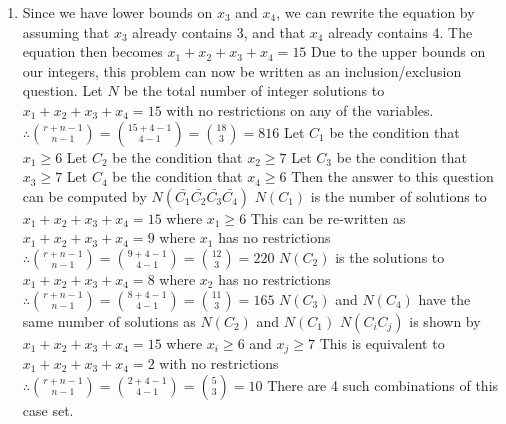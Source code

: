 \documentclass{article}
\begin{document}
\begin{enumerate}
		\item Since we have lower bounds on $x_3$ and $x_4$, we can rewrite the equation by assuming that $x_3$ already contains 3, and that $x_4$ already contains 4.
		\newline The equation then becomes $x_1+x_2+x_3+x_4=15$
		\newline Due to the upper bounds on our integers, this problem can now be written as an inclusion/exclusion question.
		\newline
		\newline Let $N$ be the total number of integer solutions to $x_1+x_2+x_3+x_4=15$ with no restrictions on any of the variables.
		\newline $\therefore {{r+n-1}\choose{n-1}}={{15+4-1}\choose{4-1}}={18\choose3}=816$
		\newline Let $C_1$ be the condition that $x_1\geq6$
		\newline Let $C_2$ be the condition that $x_2\geq7$
		\newline Let $C_3$ be the condition that $x_3\geq7$
		\newline Let $C_4$ be the condition that $x_4\geq6$
		\newline Then the answer to this question can be computed by $N(\bar{C_1}\bar{C_2}\bar{C_3}\bar{C_4})$
		\newline
		\newline $N(C_1)$ is the number of solutions to $x_1+x_2+x_3+x_4=15$ where $x_1\geq6$
		\newline This can be re-written as $x_1+x_2+x_3+x_4=9$ where $x_1$ has no restrictions
		\newline $\therefore {{r+n-1}\choose{n-1}}={{9+4-1}\choose{4-1}}={12\choose3}=220$
		\newline $N(C_2)$ is the solutions to $x_1+x_2+x_3+x_4=8$ where $x_2$ has no restrictions
		\newline $\therefore {{r+n-1}\choose{n-1}}={{8+4-1}\choose{4-1}}={11\choose3}=165$
		\newline $N(C_3)$ and $N(C_4)$ have the same number of solutions as $N(C_2)$ and $N(C_1)$
		\newline
		\newline $N(C_iC_j)$ is shown by $x_1+x_2+x_3+x_4=15$ where $x_i\geq6$ and $x_j\ge7$
		\newline This is equivalent to $x_1+x_2+x_3+x_4=2$ with no restrictions
		\newline $\therefore {{r+n-1}\choose{n-1}}={{2+4-1}\choose{4-1}}={5\choose3}=10$
		\newline There are 4 such combinations of this case set.

\end{enumerate}
\end{document}
